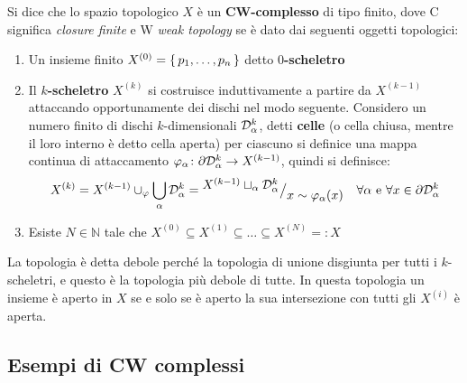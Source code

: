 \begin{definition}
  Si dice che lo spazio topologico $ X $ è un \textbf{CW-complesso} di tipo finito,
  dove C significa \emph{closure finite} e W \emph{weak topology} se è dato dai seguenti oggetti topologici:
  \begin{enumerate}
  \item Un insieme finito $ X^{(0)} = \set{p_1, \dots, p_n} $ detto \textbf{$ 0 $-scheletro}
  \item Il \textbf{$ k $-scheletro} $ X^{(k)} $ si costruisce induttivamente
    a partire da $ X^{(k-1)} $ attaccando opportunamente dei dischi nel modo seguente.
    Considero un numero finito di dischi $ k $-dimensionali $ \mathcal{D}^{k}_\alpha $,
    detti \textbf{celle} (o cella chiusa, mentre
    il loro interno è detto cella aperta) per ciascuno si definice una mappa
    continua di attaccamento $ \varphi_\alpha \colon \partial\mathcal{D}^{k}_\alpha \to X^{(k-1)} $, quindi si definisce:
    \[
      X^{(k)} = X^{(k-1)} \cup_\varphi \bigcup_\alpha \mathcal{D}^{k}_\alpha ={^{\textstyle  X^{(k-1)} \sqcup_\alpha \mathcal{D}^{k}_\alpha}\big/_{\textstyle x \sim \varphi_\alpha(x)}} \quad \forall \alpha \text{ e }
      \forall x \in \partial \mathcal{D}^{k}_\alpha
    \]
  \item Esiste $ N \in \mathbb{N} $ tale che $ X^{(0)} \subseteq X^{(1)} \subseteq \dots \subseteq X^{(N)} =: X $
  \end{enumerate}
\end{definition}

\begin{osservation}
La topologia è detta debole perché la topologia di unione disgiunta per tutti i $ k $-scheletri,
e questo è la topologia più debole di tutte. In questa topologia un insieme è aperto in $ X $
se e solo se è aperto la sua intersezione con tutti gli $ X^{(i)} $ è aperta.
\end{osservation}


\subsection{Esempi di CW complessi}

